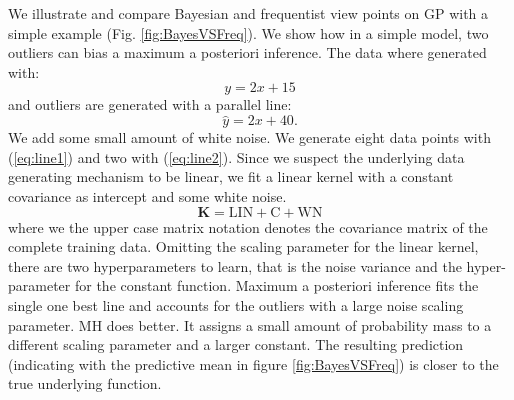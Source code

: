 We illustrate and compare Bayesian and frequentist view points on GP with a simple example (Fig. \ref{fig:BayesVSFreq}). We show how in a simple model, two outliers can bias a maximum a posteriori inference. The data where generated with:
\begin{equation}
\label{eq:line1}
y = 2x + 15
\end{equation}
and outliers are generated with a parallel line:
\begin{equation}
\label{eq:line2}
\hat{y} = 2x + 40.
\end{equation}
We add some small amount of white noise. We generate eight data points with (\ref{eq:line1}) and two with (\ref{eq:line2}). Since we suspect the underlying data generating mechanism to be linear, we fit a linear kernel with a constant covariance as intercept and some white noise.
\begin{equation}
\mathbf{K} = \text{LIN} + \text{C} + \text{WN}
\end{equation}
where we the upper case matrix notation denotes the covariance matrix of the complete training data. Omitting the scaling parameter for the linear kernel, there are two hyperparameters to learn, that is the noise variance and the hyper-parameter for the constant function. Maximum a posteriori inference fits the single one best line and accounts for the outliers with a large noise scaling parameter. MH does better. It assigns a small amount of probability mass to a different scaling parameter and a larger constant. The resulting prediction (indicating with the predictive mean in figure \ref{fig:BayesVSFreq}) is closer to the true underlying function.   


